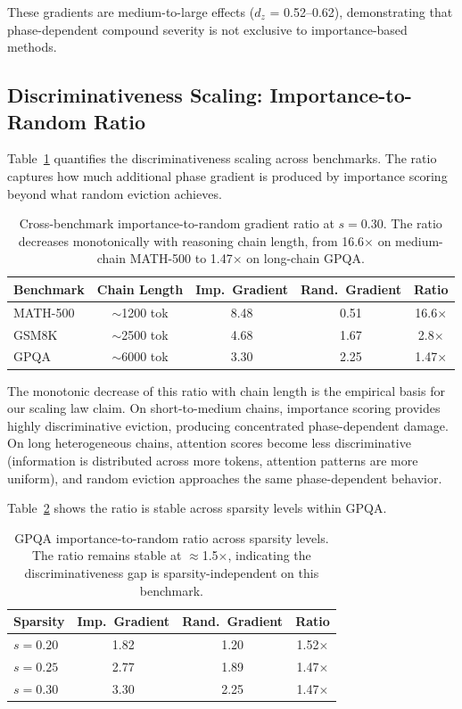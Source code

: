 \documentclass[11pt,a4paper]{article}
\begin{document}
These gradients are medium-to-large effects ($d_z$ = 0.52--0.62), demonstrating that phase-dependent compound severity is not exclusive to importance-based methods.

\subsection{Discriminativeness Scaling: Importance-to-Random Ratio}

Table~\ref{tab:imp_rand_ratio} quantifies the discriminativeness scaling across benchmarks. The ratio captures how much additional phase gradient is produced by importance scoring beyond what random eviction achieves.

\begin{table}[h]
\centering
\caption{Cross-benchmark importance-to-random gradient ratio at $s=0.30$. The ratio decreases monotonically with reasoning chain length, from 16.6$\times$ on medium-chain MATH-500 to 1.47$\times$ on long-chain GPQA.}
\label{tab:imp_rand_ratio}
\begin{tabular}{lcccc}
\toprule
Benchmark & Chain Length & Imp.\ Gradient & Rand.\ Gradient & Ratio \\
\midrule
MATH-500 & $\sim$1200 tok & 8.48 & 0.51 & 16.6$\times$ \\
GSM8K & $\sim$2500 tok & 4.68 & 1.67 & 2.8$\times$ \\
GPQA & $\sim$6000 tok & 3.30 & 2.25 & 1.47$\times$ \\
\bottomrule
\end{tabular}
\end{table}

The monotonic decrease of this ratio with chain length is the empirical basis for our scaling law claim. On short-to-medium chains, importance scoring provides highly discriminative eviction, producing concentrated phase-dependent damage. On long heterogeneous chains, attention scores become less discriminative (information is distributed across more tokens, attention patterns are more uniform), and random eviction approaches the same phase-dependent behavior.

Table~\ref{tab:imp_rand_gpqa_sparsity} shows the ratio is stable across sparsity levels within GPQA.

\begin{table}[h]
\centering
\caption{GPQA importance-to-random ratio across sparsity levels. The ratio remains stable at $\approx$1.5$\times$, indicating the discriminativeness gap is sparsity-independent on this benchmark.}
\label{tab:imp_rand_gpqa_sparsity}
\begin{tabular}{lccc}
\toprule
Sparsity & Imp.\ Gradient & Rand.\ Gradient & Ratio \\
\midrule
$s=0.20$ & 1.82 & 1.20 & 1.52$\times$ \\
$s=0.25$ & 2.77 & 1.89 & 1.47$\times$ \\
$s=0.30$ & 3.30 & 2.25 & 1.47$\times$ \\
\bottomrule
\end{tabular}
\end{table}
\end{document}
